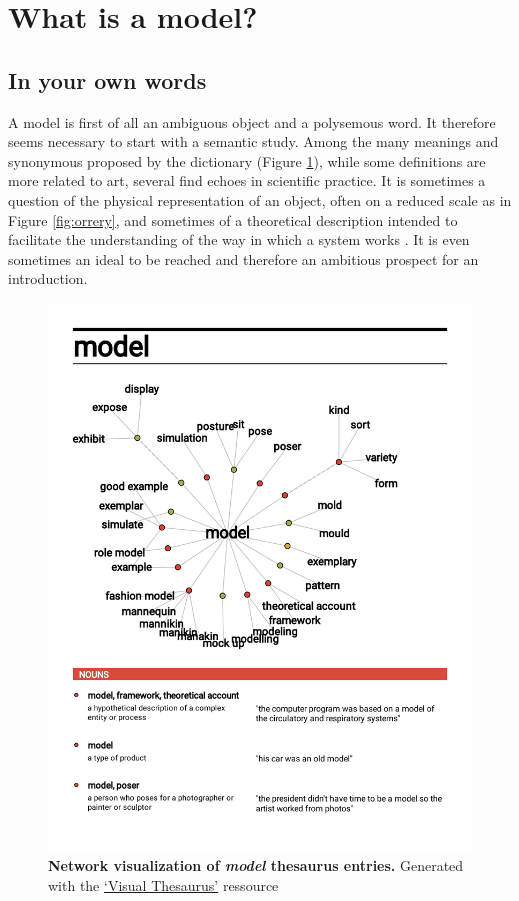 \documentclass[a4paper,12pt,twoside,onecolumn,openright,final,oldfontcommands]{memoir}
\begin{document}
\section{What is a model?}\label{what-is-a-model}

\subsection{In your own words}\label{in-your-own-words}

A model is first of all an ambiguous object and a polysemous word. It
therefore seems necessary to start with a semantic study. Among the many
meanings and synonymous proposed by the dictionary (Figure
\ref{fig:visual-thesaurus}), while some definitions are more related to
art, several find echoes in scientific practice. It is sometimes a
question of the physical representation of an object, often on a reduced
scale as in Figure \ref{fig:orrery}, and sometimes of a theoretical
description intended to facilitate the understanding of the way in which
a system works \citep{dictionnarymodel}. It is even sometimes an ideal
to be reached and therefore an ambitious prospect for an introduction.

\begin{figure}

{\centering \includegraphics[width=0.9\linewidth]{fig/visualThesaurus} 

}

\caption[Network visualization of \emph{model} thesaurus entries]{\textbf{Network visualization of
\emph{model} thesaurus entries.} Generated with the
\href{https://www.visualthesaurus.com}{`Visual Thesaurus'} ressource}\label{fig:visual-thesaurus}
\end{figure}
\end{document}
